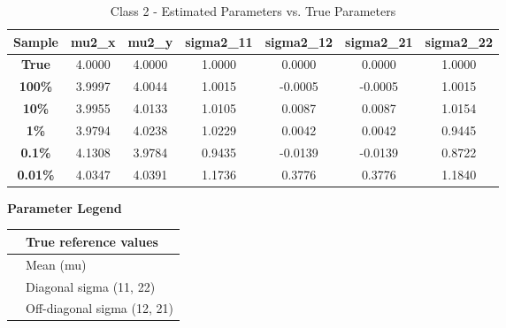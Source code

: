 \documentclass{article}
\begin{document}
\begin{table}[H]
\centering
\small
\caption{Class 2 - Estimated Parameters vs. True Parameters}
\vspace{0.5em}
\begin{tabular}{ccccccc}
\toprule
\textbf{Sample} & \textbf{mu2\_x} & \textbf{mu2\_y} & \textbf{sigma2\_11} & \textbf{sigma2\_12} & \textbf{sigma2\_21} & \textbf{sigma2\_22} \\
\midrule
\textbf{True} & \cellcolor{trueyellow} 4.0000 & \cellcolor{trueyellow} 4.0000 & \cellcolor{trueyellow} 1.0000 & \cellcolor{trueyellow} 0.0000 & \cellcolor{trueyellow} 0.0000 & \cellcolor{trueyellow} 1.0000 \\
\textbf{100\%} & \cellcolor{meangreen} 3.9997 & \cellcolor{meangreen} 4.0044 & \cellcolor{sigmablue} 1.0015 & \cellcolor{offpurple} -0.0005 & \cellcolor{offpurple} -0.0005 & \cellcolor{sigmablue} 1.0015 \\
\textbf{10\%} & \cellcolor{meangreen} 3.9955 & \cellcolor{meangreen} 4.0133 & \cellcolor{sigmablue} 1.0105 & \cellcolor{offpurple} 0.0087 & \cellcolor{offpurple} 0.0087 & \cellcolor{sigmablue} 1.0154 \\
\textbf{1\%} & \cellcolor{meangreen} 3.9794 & \cellcolor{meangreen} 4.0238 & \cellcolor{sigmablue} 1.0229 & \cellcolor{offpurple} 0.0042 & \cellcolor{offpurple} 0.0042 & \cellcolor{sigmablue} 0.9445 \\
\textbf{0.1\%} & \cellcolor{meangreen} 4.1308 & \cellcolor{meangreen} 3.9784 & \cellcolor{sigmablue} 0.9435 & \cellcolor{offpurple} -0.0139 & \cellcolor{offpurple} -0.0139 & \cellcolor{sigmablue} 0.8722 \\
\textbf{0.01\%} & \cellcolor{meangreen} 4.0347 & \cellcolor{meangreen} 4.0391 & \cellcolor{sigmablue} 1.1736 & \cellcolor{offpurple} 0.3776 & \cellcolor{offpurple} 0.3776 & \cellcolor{sigmablue} 1.1840 \\
\bottomrule
\end{tabular}
\end{table}

\begin{center}
\textbf{Parameter Legend} \\
\begin{tabular}{|l|l|}
\hline
\cellcolor{trueyellow} & True reference values \\ \hline
\cellcolor{meangreen} & Mean (mu) \\ \hline
\cellcolor{sigmablue} & Diagonal sigma (11, 22) \\ \hline
\cellcolor{offpurple} & Off-diagonal sigma (12, 21) \\ \hline
\end{tabular}
\end{center}
\end{document}
